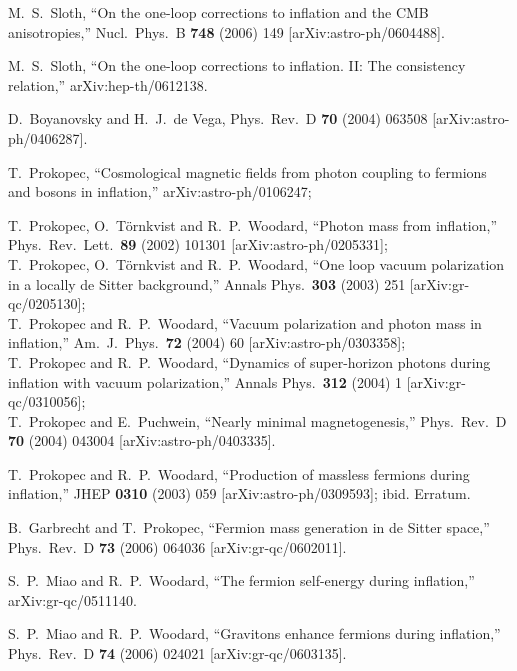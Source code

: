 \begin{thebibliography}{999}
  M.~S.~Sloth,
  ``On the one-loop corrections to inflation and the CMB anisotropies,''
  Nucl.\ Phys.\  B {\bf 748} (2006) 149
  [arXiv:astro-ph/0604488].

  M.~S.~Sloth,
  ``On the one-loop corrections to inflation. II: The consistency relation,''
  arXiv:hep-th/0612138.

  D.~Boyanovsky and H.~J.~de Vega,
  Phys.\ Rev.\  D {\bf 70} (2004) 063508
  [arXiv:astro-ph/0406287].

 T.~Prokopec,
  ``Cosmological magnetic fields from photon coupling to fermions and  bosons
  in inflation,''
  arXiv:astro-ph/0106247;

  T.~Prokopec, O.~T\"ornkvist and R.~P.~Woodard,
  ``Photon mass from inflation,''
  Phys.\ Rev.\ Lett.\  {\bf 89} (2002) 101301
  [arXiv:astro-ph/0205331];
\\
  T.~Prokopec, O.~T\"ornkvist and R.~P.~Woodard,
  ``One loop vacuum polarization in a locally de Sitter background,''
  Annals Phys.\  {\bf 303} (2003) 251
  [arXiv:gr-qc/0205130];
\\
  T.~Prokopec and R.~P.~Woodard,
  ``Vacuum polarization and photon mass in inflation,''
  Am.\ J.\ Phys.\  {\bf 72} (2004) 60
  [arXiv:astro-ph/0303358];
\\
  T.~Prokopec and R.~P.~Woodard,
  ``Dynamics of super-horizon photons during inflation with vacuum
  polarization,''
  Annals Phys.\  {\bf 312} (2004) 1
  [arXiv:gr-qc/0310056];
\\
  T.~Prokopec and E.~Puchwein,
  ``Nearly minimal magnetogenesis,''
  Phys.\ Rev.\ D {\bf 70} (2004) 043004
  [arXiv:astro-ph/0403335].

  T.~Prokopec and R.~P.~Woodard,
  ``Production of massless fermions during inflation,''
  JHEP {\bf 0310} (2003) 059
  [arXiv:astro-ph/0309593];
  ibid. Erratum.

  B.~Garbrecht and T.~Prokopec,
  ``Fermion mass generation in de Sitter space,''
  Phys.\ Rev.\  D {\bf 73} (2006) 064036
  [arXiv:gr-qc/0602011].

  S.~P.~Miao and R.~P.~Woodard,
  ``The fermion self-energy during inflation,''
  arXiv:gr-qc/0511140.

  S.~P.~Miao and R.~P.~Woodard,
  ``Gravitons enhance fermions during inflation,''
  Phys.\ Rev.\  D {\bf 74} (2006) 024021
  [arXiv:gr-qc/0603135].


\end{thebibliography}
